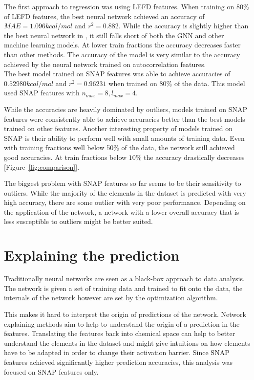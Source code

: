 The first approach to regression was using LEFD features.
When training on 80\% of LEFD features, the best neural network achieved an accuracy of $MAE = 1.096 kcal/mol$ and $r^2=0.882$.
While the accuracy is slightly higher than the best neural network in \cite{friederich_dos}, it still falls short 
of both the GNN and other machine learning models.
At lower train fractions the accuracy decreases faster than other methods.
The accuracy of the model is very similar to the accuracy achieved by the neural network trained on autocorrelation 
features.
\\
The best model trained on SNAP features was able to achieve accuracies of $0.52980 kcal/mol$ and
$r^2 = 0.96231$ when trained on 80\% of the data.
This model used SNAP features with $n_{max}=8, l_{max}=4$.

While the accuracies are heavily dominated by outliers, models trained on SNAP features were consistently
able to achieve accuracies better than the best models trained on other features.
Another interesting property of models trained on SNAP is their ability to perform well with small amounts 
of training data.
Even with training fractions well below 50\% of the data, the network still achieved good accuracies.
At train fractions below $10\%$ the accuracy drastically decreases [Figure~\ref{fig:comparison}].

The biggest problem with SNAP features so far seems to be their sensitivity to outliers.
While the majority of the elements in the dataset is predicted with very high accuracy, 
there are some outlier with very poor performance.
Depending on the application of the network, a network with a lower overall accuracy 
that is less susceptible to outliers might be better suited.



\newpage
\section{Explaining the prediction}

Traditionally neural networks are seen as a black-box approach to data analysis.
The network is given a set of training data and trained to fit onto the data,
the internals of the network however are set by the optimization algorithm.

This makes it hard to interpret the origin of predictions of the network.
Network explaining methods aim to help to understand the origin of a prediction in the features.
Translating the features back into chemical space can help to better understand 
the elements in the dataset and might give intuitions on how elements have to be adapted in order to change their activation barrier.
Since SNAP features achieved significantly higher prediction accuracies,
this analysis was focused on SNAP features only.

